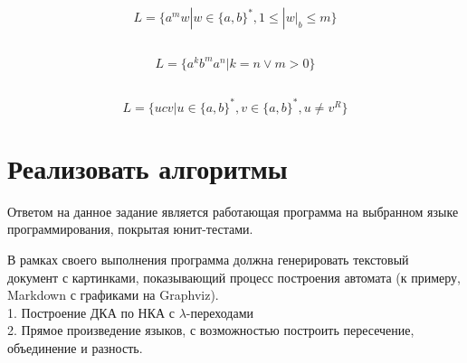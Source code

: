 \documentclass[a4paper, 12pt]{article}
\begin{document}
\subsection{}
$$L = \{a^mw | w \in \{a, b\}^*, 1 \leq |w|_b \leq m  \}$$

\subsection{}
$$L = \{ a^kb^ma^n | k = n \lor m > 0\}$$

\subsection{}
$$L = \{ ucv | u \in \{a,b\}^*, v \in \{a,b\}^*, u \neq v^R \}$$
\newpage


\section{Реализовать алгоритмы}
Ответом на данное задание является работающая программа на выбранном языке программирования, покрытая юнит-тестами.

В рамках своего выполнения программа должна генерировать текстовый документ с картинками, показывающий процесс построения автомата (к примеру, Markdown с графиками на Graphviz).\\
1. Построение ДКА по НКА с $\lambda$-переходами \\
2. Прямое произведение языков, с возможностью построить пересечение, объединение и разность.
\end{document}
